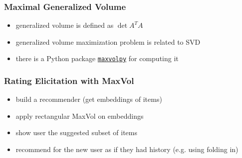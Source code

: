 \documentclass[t]{beamer}
\begin{document}
\begin{frame}
  \frametitle{Maximal Generalized Volume}
  \begin{itemize}
  \item generalized volume is defined as $\det A^TA$
  \item generalized volume maximization problem is related to SVD
  \item there is a Python package \href{https://pypi.org/project/maxvolpy/}{\texttt{maxvolpy}} for computing it
  \end{itemize}
\end{frame}
\begin{frame}
  \frametitle{Rating Elicitation with MaxVol}
  \begin{itemize}
  \item build a recommender (get embeddings of items)
  \item apply rectangular MaxVol on embeddings
  \item show user the suggested subset of items
  \item recommend for the new user as if they had history (e.g. using folding in)
  \end{itemize}
\end{frame}
\end{document}
